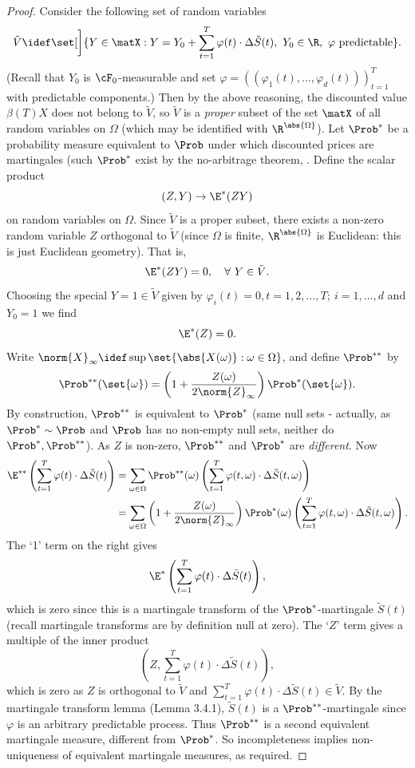 \begin{proof}
	Consider the following set of random variables
	\[
		\tilde{V} \idef \set[\bigg]{Y \in \matX : Y = Y_0 + \sum_{t=1}^T \varphi(t) \cdot \Delta \tilde{S}(t), \ Y_0 \in \R, \ \varphi \text{ predictable}}.
	\]
	(Recall that $Y_0$ is $\cF_0$-measurable and set $\varphi = ((\varphi_1(t), \dots, \varphi_d(t)))_{t=1}^T$ with predictable components.) Then by the above reasoning, the discounted value $\beta(T)X$ does not belong to $\tilde{V}$, so $\tilde{V}$ is a \textit{proper} subset of the set $\matX$ of all random variables on $\Omega$ (which may be identified with $\R^{\abs{\Omega}}$). Let $\Prob^*$ be a probability measure equivalent to $\Prob$ under which discounted prices are martingales (such $\Prob^*$ exist by the no-arbitrage theorem, . Define the scalar product
	\[
		(Z, Y) \to \E^*(ZY)
	\]
	on random variables on $\Omega$. Since $\tilde{V}$ is a proper subset, there exists a non-zero random variable $Z$ orthogonal to $\tilde{V}$ (since $\Omega$ is finite, $\R^{\abs{\Omega}}$ is Euclidean: this is just Euclidean geometry). That is,
	\[
		\E^*(ZY) = 0, \quad \forall \ Y \in \tilde{V}.
	\]
	Choosing the special $Y = 1 \in \tilde{V}$ given by $\varphi_i(t) = 0, t = 1, 2, \dots, T; \ i = 1, \dots, d$ and $Y_0 = 1$ we find
	\[
		\E^*(Z) = 0.
	\]
	Write $\norm{X}_\infty \idef \sup\set{\abs{X(\omega)} : \omega \in \Omega}$, and define $\Prob^{**}$ by
	\[
		\Prob^{**}(\set{\omega}) = \left( 1 + \frac{Z(\omega)}{2\norm{Z}_\infty} \right) \Prob^*(\set{\omega}).
	\]
	By construction, $\Prob^{**}$ is equivalent to $\Prob^*$ (same null sets - actually, as $\Prob^* \sim \Prob$ and $\Prob$ has no non-empty null sets, neither do $\Prob^*, \Prob^{**}$). As $Z$ is non-zero, $\Prob^{**}$ and $\Prob^*$ are \textit{different}. Now
	\begin{align*}
		\E^{**} \left( \sum_{t=1}^T \varphi(t) \cdot \Delta \tilde{S}(t) \right) & = \sum_{\omega \in \Omega} \Prob^{**}(\omega) \left( \sum_{t=1}^T \varphi(t, \omega) \cdot \Delta \tilde{S}(t, \omega) \right)                                                     \\
		                                                                         & = \sum_{\omega \in \Omega} \left( 1 + \frac{Z(\omega)}{2\norm{Z}_\infty} \right) \Prob^*(\omega) \left( \sum_{t=1}^T \varphi(t, \omega) \cdot \Delta \tilde{S}(t, \omega) \right).
	\end{align*}
	The `1' term on the right gives
	\[
		\E^* \left( \sum_{t=1}^T \varphi(t) \cdot \Delta \tilde{S}(t) \right),
	\]
	which is zero since this is a martingale transform of the $\Prob^*$-martingale $\tilde{S}(t)$ (recall martingale transforms are by definition null at zero). The `$Z$' term gives a multiple of the inner product
	\[
		\left(Z, \sum_{t=1}^T \varphi(t) \cdot \Delta \tilde{S}(t)\right),
	\]
	which is zero as $Z$ is orthogonal to $\tilde{V}$ and $\sum_{t=1}^T \varphi(t) \cdot \Delta \tilde{S}(t) \in \tilde{V}$. By the martingale transform lemma (Lemma 3.4.1), $\tilde{S}(t)$ is a $\Prob^{**}$-martingale since $\varphi$ is an arbitrary predictable process. Thus $\Prob^{**}$ is a second equivalent martingale measure, different from $\Prob^*$. So incompleteness implies non-uniqueness of equivalent martingale measures, as required.
\end{proof}

